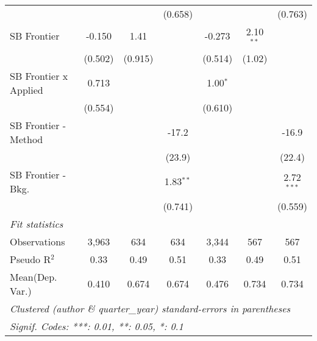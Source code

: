 \begin{tabular}{lcccccc}
                                  &                &               & (0.658)       &                &              & (0.763)\\   
   SB Frontier                    & -0.150         & 1.41          &               & -0.273         & 2.10$^{**}$  &   \\   
                                  & (0.502)        & (0.915)       &               & (0.514)        & (1.02)       &   \\   
   SB Frontier x Applied          & 0.713          &               &               & 1.00$^{*}$     &              &   \\   
                                  & (0.554)        &               &               & (0.610)        &              &   \\   
   SB Frontier - Method           &                &               & -17.2         &                &              & -16.9\\   
                                  &                &               & (23.9)        &                &              & (22.4)\\   
   SB Frontier - Bkg.             &                &               & 1.83$^{**}$   &                &              & 2.72$^{***}$\\   
                                  &                &               & (0.741)       &                &              & (0.559)\\   
   \midrule
   \emph{Fit statistics}\\
   Observations                   & 3,963          & 634           & 634           & 3,344          & 567          & 567\\  
   Pseudo R$^2$                   & 0.33           & 0.49          & 0.51          & 0.33           & 0.49         & 0.51\\  
Mean(Dep. Var.) & 0.410 & 0.674 & 0.674 & 0.476 & 0.734 & 0.734 \\
   \midrule \midrule
   \multicolumn{7}{l}{\emph{Clustered (author \& quarter\_year) standard-errors in parentheses}}\\
   \multicolumn{7}{l}{\emph{Signif. Codes: ***: 0.01, **: 0.05, *: 0.1}}\\
\end{tabular}
\par\endgroup
